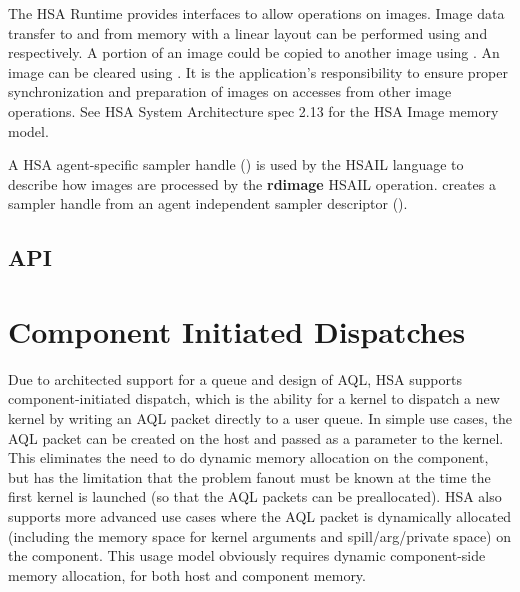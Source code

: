 \documentclass[final]{book}
\newcommand{\reffun}[1]{\textbf{#1}}
\newcommand{\refhsl}[1]{\reffun{#1}}
\begin{document}
The HSA Runtime provides interfaces to allow operations on images. Image data
transfer to and from memory with a linear layout can be performed using
 and  respectively. A
portion of an image could be copied to another image using
. An image can be cleared using
. It is the application's responsibility to ensure
proper synchronization and preparation of images on accesses from other image
operations. See HSA System Architecture spec 2.13 for the HSA Image memory
model.

A HSA agent-specific sampler handle () is used
by the HSAIL language to describe how images are processed by the
\refhsl{rdimage} HSAIL operation.  creates
a sampler handle from an agent independent sampler descriptor
().

\subsection{API}


\section{Component Initiated Dispatches} \label{architected}

Due to architected support for a queue and design of AQL, HSA supports
component-initiated dispatch, which is the ability for a kernel to dispatch a
new kernel by writing an AQL packet directly to a user queue. In simple use
cases, the AQL packet can be created on the host and passed as a parameter to
the kernel. This eliminates the need to do dynamic memory allocation on the
component, but has the limitation that the problem fanout must be known at the
time the first kernel is launched (so that the AQL packets can be
preallocated). HSA also supports more advanced use cases where the AQL packet is
dynamically allocated (including the memory space for kernel arguments and
spill/arg/private space) on the component. This usage model obviously requires
dynamic component-side memory allocation, for both host and component memory.
\end{document}
